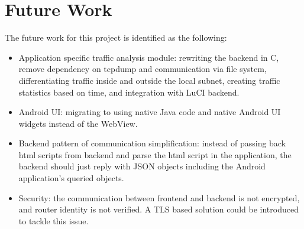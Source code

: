 \section{Future Work}

The future work for this project is identified as the following:

\begin{itemize}

\item Application specific traffic analysis module: rewriting the backend in C, remove dependency on tcpdump and communication via file system, differentiating traffic inside and outside the local subnet, creating traffic statistics based on time, and integration with LuCI backend.

\item Android UI: migrating to using native Java code and native Android UI widgets instead of the WebView.

\item Backend pattern of communication simplification: instead of passing back html scripts from backend and parse the html script in the application, the backend should just reply with JSON objects including the Android application's queried objects.

\item Security: the communication between frontend and backend is not encrypted, and router identity is not verified. A TLS based solution could be introduced to tackle this issue.

\end{itemize}